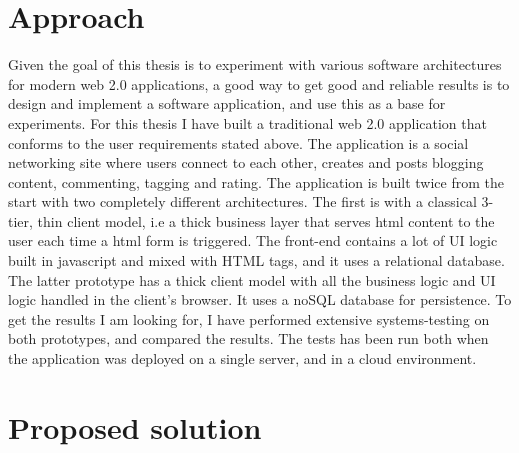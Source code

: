 \section{Approach}
	Given the goal of this thesis is to experiment with
                various software architectures for modern web 2.0
                applications, a good way to get good and reliable
                results is to design and implement a software
                application, and use this as a base for
                experiments. For this thesis I have built a
                traditional web 2.0 application that conforms to the user requirements
                stated above. The application is a social networking
                site where users connect to each other, creates and
                posts blogging content, commenting, tagging and
                rating. The application is built twice from the
                start with two completely different architectures. The
                first is with a classical 3-tier, thin client model,
                i.e a thick business layer that serves html content to
                the user each time a html form is triggered. The
                front-end contains a lot of UI logic built in
                javascript and mixed with HTML tags, and it uses a
                relational database. The latter prototype has a thick
                client model with all the business logic and UI logic
                handled in the client's browser. It uses a noSQL
                database for persistence. To get the results I am
                looking for, I have performed extensive systems-testing
                on both prototypes, and compared the results. The
                tests has been run both when the application was
                deployed on a single server, and in a cloud environment.

	\section{Proposed solution}
%	
	
